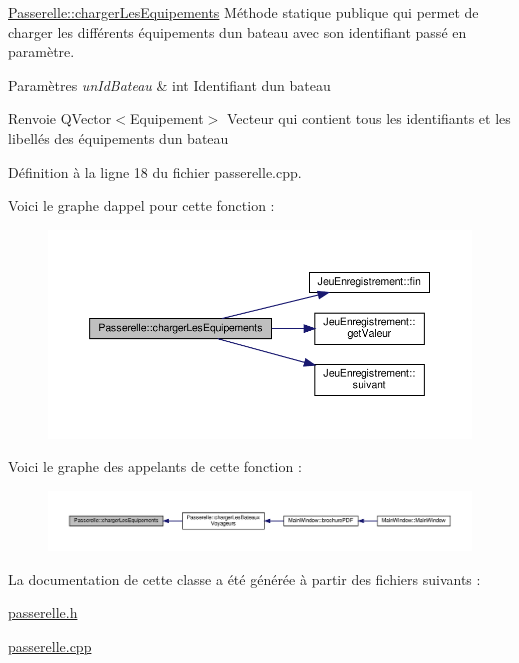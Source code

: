 \hyperlink{class_passerelle_a7388ba173e23ebf4ceb26d878e9503b3}{Passerelle\+::charger\+Les\+Equipements} Méthode statique publique qui permet de charger les différents équipements d\textquotesingle{}un bateau avec son identifiant passé en paramètre. 


\begin{DoxyParams}{Paramètres}
{\em un\+Id\+Bateau} & int Identifiant d\textquotesingle{}un bateau \\
\hline
\end{DoxyParams}
\begin{DoxyReturn}{Renvoie}
Q\+Vector$<$\+Equipement$>$ Vecteur qui contient tous les identifiants et les libellés des équipements d\textquotesingle{}un bateau 
\end{DoxyReturn}


Définition à la ligne 18 du fichier passerelle.\+cpp.

Voici le graphe d\textquotesingle{}appel pour cette fonction \+:\nopagebreak
\begin{figure}[H]
\begin{center}
\leavevmode
\includegraphics[width=350pt]{class_passerelle_a7388ba173e23ebf4ceb26d878e9503b3_cgraph}
\end{center}
\end{figure}
Voici le graphe des appelants de cette fonction \+:\nopagebreak
\begin{figure}[H]
\begin{center}
\leavevmode
\includegraphics[width=350pt]{class_passerelle_a7388ba173e23ebf4ceb26d878e9503b3_icgraph}
\end{center}
\end{figure}


La documentation de cette classe a été générée à partir des fichiers suivants \+:\begin{DoxyCompactItemize}
\item 
\hyperlink{passerelle_8h}{passerelle.\+h}\item 
\hyperlink{passerelle_8cpp}{passerelle.\+cpp}\end{DoxyCompactItemize}
